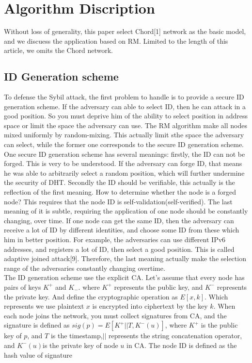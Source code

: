 \documentclass[10pt]{article}
\begin{document}
\section{Algorithm Discription}
Without loss of generality, this paper select Chord[1] network as the basic model, and we discuess the application based on RM. Limited to the length of this article, we omits the Chord network.\\
\subsection{ID Generation scheme}
To defense the Sybil attack, the first problem to handle is to provide a secure ID generation scheme. If the adversary can able to select ID, then he can attack in a good position. So you must deprive him of the ability to select position in address space or limit the space the adversary can use. The RM algorithm make all nodes mixed uniformly by random-mixing. This actually limit sthe space the adversary can select, while the former one corresponds to the secure ID generation scheme.\\
One secure ID generation scheme has several meanings: firstly, the ID can not be forged. This is very to be understood. If the adversary can forge ID, that means he was able to arbitrarily select a random position, which will further undermine the security of DHT. Secondly the ID should be verifiable, this actually is the reflection of the first meaning.  How to determine whether the node is a forged node? This requires that the node ID is self-validation(self-verified). The last meaning of it is subtle, requiring the application of one node should be constantly changing, over time. If one node can get the same ID, then the adversary can receive a lot of ID by different identities, and choose some ID from these which him in better position. For example, the adversaries can  use different IPv6 addresses, and registers a lot of ID, then select a good position. This is called adaptive joined attack[9]. Therefore, the last meaning actually make the selection range of the adversaries constantly changing overtime. \\
The ID generation scheme use the explicit CA. Let's assume that every node has pairs of keys \(K^+\) and \(K_-\). where \(K^+\) represents the public key,  and \(K^-\) represents the private key. And define the cryptographic  operation as \(E[x,k]\). Which represents we use plaintext \(x\) is encrypted into ciphertext by the key \(k\). When each node joins the network, you must collect signatures from CA, and the signature is defined as \(sig(p)=E[K^+||T,K^-(u)]\), where \(K^+\) is the public key of \(p\), and \(T\) is the timestamp,\(||\) represents the  string concatenation operator, and \(K^-(u)\)is the private key of node \(u\) in CA. The node ID is defined as the hash value of signature \\
\end{document}
